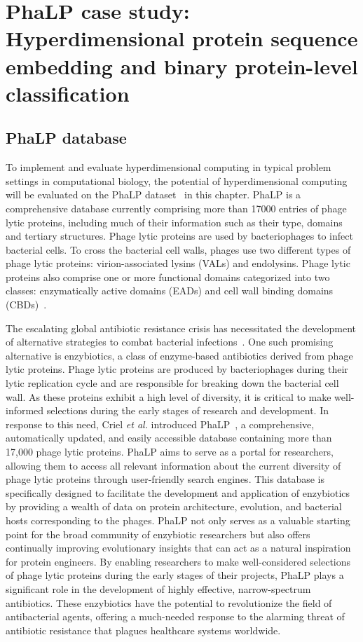 \chapter[PhaLP case study]{PhaLP case study:\\Hyperdimensional protein sequence embedding and binary protein-level classification}
\section{PhaLP database}
To implement and evaluate hyperdimensional computing in typical problem settings in computational biology, the potential of hyperdimensional computing will be evaluated on the PhaLP dataset~\cite{phalp} in this chapter. PhaLP is a comprehensive database currently comprising more than 17000 entries of phage lytic proteins, including much of their information such as their type, domains and tertiary structures. Phage lytic proteins are used by bacteriophages to infect bacterial cells. To cross the bacterial cell walls, phages use two different types of phage lytic proteins: virion-associated lysins (VALs) and endolysins. Phage lytic proteins also comprise one or more functional domains categorized into two classes: enzymatically active domains (EADs) and cell wall binding domains (CBDs)~\cite{phage}.

The escalating global antibiotic resistance crisis has necessitated the development of alternative strategies to combat bacterial infections~\cite{antibiotic}. One such promising alternative is enzybiotics, a class of enzyme-based antibiotics derived from phage lytic proteins. Phage lytic proteins are produced by bacteriophages during their lytic replication cycle and are responsible for breaking down the bacterial cell wall. As these proteins exhibit a high level of diversity, it is critical to make well-informed selections during the early stages of research and development. In response to this need, Criel \textit{ et al.} introduced PhaLP~\cite{phalp}, a comprehensive, automatically updated, and easily accessible database containing more than 17,000 phage lytic proteins. PhaLP aims to serve as a portal for researchers, allowing them to access all relevant information about the current diversity of phage lytic proteins through user-friendly search engines. This database is specifically designed to facilitate the development and application of enzybiotics by providing a wealth of data on protein architecture, evolution, and bacterial hosts corresponding to the phages. PhaLP not only serves as a valuable starting point for the broad community of enzybiotic researchers but also offers continually improving evolutionary insights that can act as a natural inspiration for protein engineers. By enabling researchers to make well-considered selections of phage lytic proteins during the early stages of their projects, PhaLP plays a significant role in the development of highly effective, narrow-spectrum antibiotics. These enzybiotics have the potential to revolutionize the field of antibacterial agents, offering a much-needed response to the alarming threat of antibiotic resistance that plagues healthcare systems worldwide.

